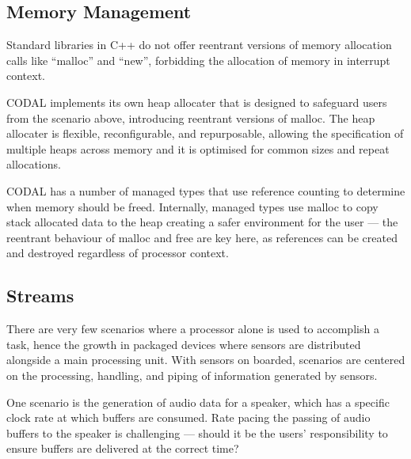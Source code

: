 
\subsection{Memory Management}

Standard libraries in C++ do not offer reentrant versions of memory allocation calls like ``malloc'' and ``new'', forbidding the allocation of memory in interrupt context.

CODAL implements its own heap allocater that is designed to safeguard users from the scenario above, introducing reentrant versions of malloc. The heap allocater is flexible, reconfigurable, and repurposable, allowing the specification of multiple heaps across memory and it is optimised for common sizes and repeat allocations.

CODAL has a number of managed types that use reference counting to determine when memory should be freed. Internally, managed types use malloc to copy stack allocated data to the heap creating a safer environment for the user --- the reentrant behaviour of malloc and free are key here, as references can be created and destroyed regardless of processor context.

\subsection{Streams}
There are very few scenarios where a processor alone is used to accomplish a task, hence the growth in packaged devices where sensors are distributed alongside a main processing unit. With sensors on boarded, scenarios are centered on the processing, handling, and piping of information generated by sensors.

One scenario is the generation of audio data for a speaker, which has a specific clock rate at which buffers are consumed. Rate pacing the passing of audio buffers to the speaker is challenging --- should it be the users' responsibility to ensure buffers are delivered at the correct time?

